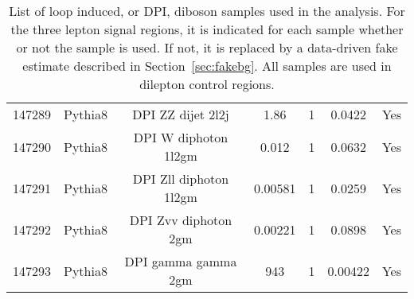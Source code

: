 \begin{table}[ht!]
\begin{footnotesize}
\begin{tabular}{c|c|c|c|c|c|c}
147289 & Pythia8 & DPI ZZ dijet 2l2j & 1.86 & 1 & 0.0422 & Yes  \\
147290 & Pythia8 & DPI W diphoton 1l2gm & 0.012 & 1 & 0.0632 & Yes  \\
147291 & Pythia8 & DPI Zll diphoton 1l2gm & 0.00581 & 1 & 0.0259 & Yes  \\
147292 & Pythia8 & DPI Zvv diphoton 2gm & 0.00221 & 1 & 0.0898 & Yes  \\
147293 & Pythia8 & DPI gamma gamma 2gm & 943 & 1 & 0.00422 & Yes  \\
\hline 
\end{tabular}
\end{footnotesize}
\caption{List of loop induced, or DPI, diboson samples used in the analysis.
For the three lepton signal regions, it is indicated for each
sample whether or not the sample is used.  If not, it is replaced
by a data-driven fake estimate described in Section~\ref{sec:fakebg}.
All samples are used in dilepton control regions.
}
\label{tab:sample_bkg_dibosons_gg2DPI}
\end{table}




